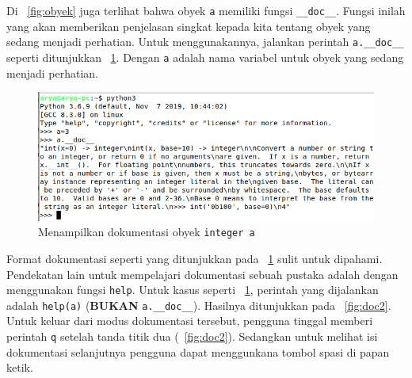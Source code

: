 Di \figurename~\ref{fig:obyek} juga terlihat bahwa obyek \texttt{a} memiliki fungsi \texttt{\_\_doc\_\_}. Fungsi inilah yang akan memberikan penjelasan singkat kepada kita tentang obyek yang sedang menjadi perhatian. Untuk menggunakannya, jalankan perintah \texttt{a.\_\_doc\_\_} seperti ditunjukkan \figurename~\ref{fig:doc}. Dengan \texttt{a} adalah nama variabel untuk obyek yang sedang menjadi perhatian.

\begin{figure}[h!]
  \begin{center}
    \includegraphics[scale=.5]{pics/interpreter3.png}
    \caption{Menampilkan dokumentasi obyek \texttt{integer a}}
    \label{fig:doc}
  \end{center}
\end{figure}

Format dokumentasi seperti yang ditunjukkan pada \figurename~\ref{fig:doc} sulit untuk dipahami. Pendekatan lain untuk mempelajari dokumentasi sebuah pustaka adalah dengan menggunakan fungsi \texttt{help}. Untuk kasus seperti \figurename~\ref{fig:doc}, perintah yang dijalankan adalah \texttt{help(a)} (\textbf{BUKAN} \texttt{a.\_\_doc\_\_}). Hasilnya ditunjukkan pada \figurename~\ref{fig:doc2}. Untuk keluar dari modus dokumentasi tersebut, pengguna tinggal memberi perintah \texttt{q} setelah tanda titik dua (\figurename~\ref{fig:doc2}). Sedangkan untuk melihat isi dokumentasi selanjutnya pengguna dapat menggunkana tombol spasi di papan ketik.

